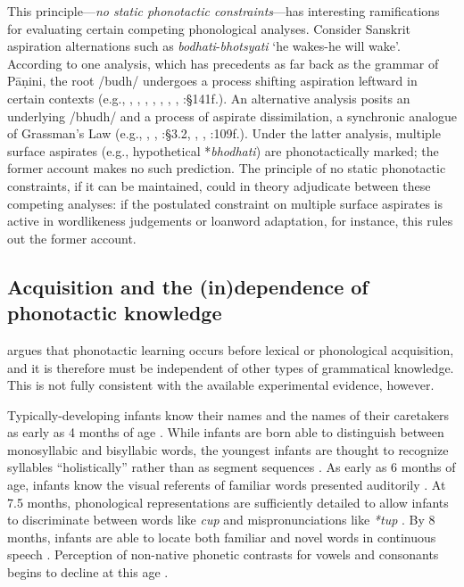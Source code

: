 This principle---\emph{no static phonotactic constraints}---has interesting ramifications for evaluating certain competing phonological analyses.
Consider Sanskrit aspiration alternations such as \emph{bodhati}-\emph{bhotsyati} `he wakes-he will wake'.
According to one analysis, which has precedents as far back as the grammar of Pāṇini, the root /budh/ undergoes a process shifting aspiration leftward in certain contexts (e.g., \citealt{Borowsky1983}, \citealt{Hoenigswald1965}, \citealt{Kaye1985}, \citealt{Sag1974}, \citeyear{Sag1976}, \citealt{Schindler1976}, \citealt{Stemberger1980}, \citealt{Whitney1889}:\S141f.).
An alternative analysis posits an underlying /bhudh/ and a process of aspirate dissimilation, a synchronic analogue of Grassman's Law (e.g., \citealt{Anderson1970}, \citealt{Hoard1975}, \citealt{Kiparsky1965}:\S3.2, \citealt{Phelps1973}, \citealt{Phelps1975b}, \citealt{Zwicky1965}:109f.).
Under the latter analysis, multiple surface aspirates (e.g., hypothetical *\emph{bhodhati}) are phonotactically marked; the former account makes no such prediction.
The principle of no static phonotactic constraints, if it can be maintained, could in theory adjudicate between these competing analyses: if the postulated constraint on multiple surface aspirates is active in wordlikeness judgements or loanword adaptation, for instance, this rules out the former account.

\subsection{Acquisition and the (in)dependence of phonotactic knowledge}
\label{ss:aerbpp}

\citet{Hayes2004b} argues that phonotactic learning occurs before lexical or phonological acquisition, and it is therefore must be independent of other types of grammatical knowledge.
This is not fully consistent with the available experimental evidence, however.

Typically-developing infants know their names and the names of their caretakers as early as 4 months of age \citep{Bortfeld2005,Mandel1995,Tincoff1999}.
While infants are born able to distinguish between monosyllabic and bisyllabic words, the youngest infants are thought to recognize syllables ``holistically'' rather than as segment sequences \citep{Bertoncini1981,Eimas1999,Jusczyk1987}.
As early as 6 months of age, infants know the visual referents of familiar words presented auditorily \citep{Bergelson2012}.
At 7.5 months, phonological representations are sufficiently detailed to allow infants to discriminate between words like \emph{cup} and mispronunciations like \emph{*tup} \citep{Jusczyk1995}.
By 8 months, infants are able to locate both familiar and novel words in continuous speech \citep{Jusczyk1997,Seidl2006}.
Perception of non-native phonetic contrasts for vowels and consonants begins to decline at this age \citep{Best1994,Polka1994,Werker1981,Werker1984,Werker1988}.

